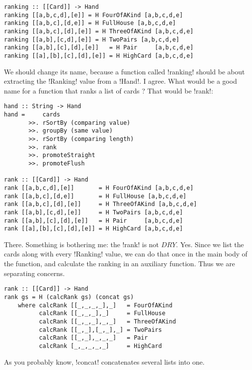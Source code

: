\begin{lstlisting}[frame=single]
ranking :: [[Card]] -> Hand
ranking [[a,b,c,d],[e]] = H FourOfAKind [a,b,c,d,e]
ranking [[a,b,c],[d,e]] = H FullHouse [a,b,c,d,e]
ranking [[a,b,c],[d],[e]] = H ThreeOfAKind [a,b,c,d,e]
ranking [[a,b],[c,d],[e]] = H TwoPairs [a,b,c,d,e]
ranking [[a,b],[c],[d],[e]]   = H Pair     [a,b,c,d,e]
ranking [[a],[b],[c],[d],[e]] = H HighCard [a,b,c,d,e] 
\end{lstlisting}
\lhN We should change its name, because a function called \il!ranking! should be about extracting the \il!Ranking! value from a \il!Hand!. 
\lhA I agree.
\lhN What would be a good name for a function that ranks a list of cards ?
\lhA That would be \il!rank!:
\begin{lstlisting}[frame=single]
hand :: String -> Hand
hand =     cards
       >>. rSortBy (comparing value)
       >>. groupBy (same value)
       >>. rSortBy (comparing length)
       >>. rank
       >>. promoteStraight
       >>. promoteFlush    

rank :: [[Card]] -> Hand
rank [[a,b,c,d],[e]]       = H FourOfAKind [a,b,c,d,e]
rank [[a,b,c],[d,e]]       = H FullHouse [a,b,c,d,e]
rank [[a,b,c],[d],[e]]     = H ThreeOfAKind [a,b,c,d,e]
rank [[a,b],[c,d],[e]]     = H TwoPairs [a,b,c,d,e]
rank [[a,b],[c],[d],[e]]   = H Pair     [a,b,c,d,e]
rank [[a],[b],[c],[d],[e]] = H HighCard [a,b,c,d,e] 
\end{lstlisting}
\success There.
\newpage \lhN Something is bothering me: the \il!rank! is not $DRY$.
\lhA Yes. Since we list the cards along with every \il!Ranking! value, we can do that once in the main body of the function, and calculate the ranking in an auxiliary function. Thus we are separating concerns.
\begin{lstlisting}[frame=single]
rank :: [[Card]] -> Hand
rank gs = H (calcRank gs) (concat gs)  
    where calcRank [[_,_,_,_],_]   = FourOfAKind 
          calcRank [[_,_,_],_]     = FullHouse
          calcRank [[_,_,_],_,_]   = ThreeOfAKind
          calcRank [[_,_],[_,_],_] = TwoPairs
          calcRank [[_,_],_,_,_]   = Pair    
          calcRank [_,_,_,_,_]     = HighCard 
\end{lstlisting}
\success As you probably know, \il!concat! concatenates several lists into one.

